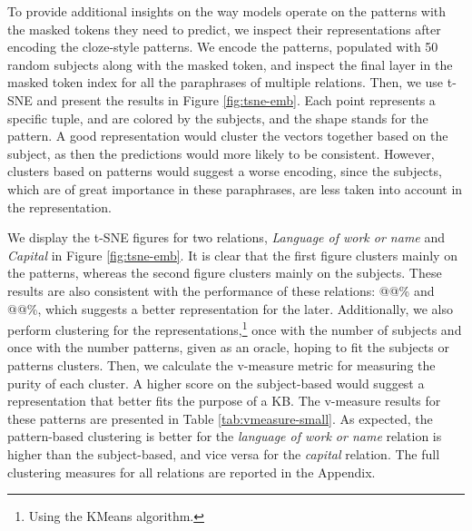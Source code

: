To provide additional insights on the way models operate on the patterns with the masked tokens they need to predict, we inspect their representations after encoding the cloze-style patterns.
We encode the patterns, populated with 50 random subjects along with the masked token, and inspect the final layer in the masked token index for all the paraphrases of multiple relations.
Then, we use t-SNE \cite{tsne} and present the results in Figure \ref{fig:tsne-emb}.
Each point represents a specific tuple, and are colored by the subjects, and the shape stands for the pattern.
A good representation would cluster the vectors together based on the subject, as then the predictions would more likely to be consistent. However, clusters based on patterns would suggest a worse encoding, since the subjects, which are of great importance in these paraphrases, are less taken into account in the representation.

We display the t-SNE figures for two relations, \textit{Language  of work or name} and \textit{Capital} in Figure \ref{fig:tsne-emb}.
It is clear that the first figure clusters mainly on the patterns, whereas the second figure clusters mainly on the subjects. These results are also consistent with the performance of these relations: @@\% and @@\%, which suggests a better representation for the later.
Additionally, we also perform clustering for the representations,\footnote{Using the KMeans algorithm.} once with the number of subjects and once with the number patterns, given as an oracle, hoping to fit the subjects or patterns clusters. Then, we calculate the v-measure metric for measuring the purity of each cluster.
A higher score on the subject-based would suggest a representation that better fits the purpose of a KB.
The v-measure results for these patterns are presented in Table \ref{tab:vmeasure-small}.
As expected, the pattern-based clustering is better for the \textit{language of work or name} relation is higher than the subject-based, and vice versa for the \textit{capital} relation.
The full clustering measures for all relations are reported in the Appendix.

